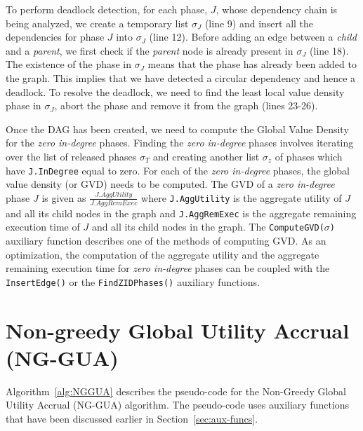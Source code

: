 \documentclass[12pt,dvips]{report}
\begin{document}
To perform deadlock detection, for each phase, $J$, whose dependency chain is being analyzed, we create a temporary list $\sigma_J$ (line 9) and insert all the dependencies for phase $J$ into $\sigma_J$ (line 12). Before adding an edge between a \textit{child} and a \textit{parent}, we first check if the \textit{parent} node is already present in $\sigma_J$ (line 18). The existence of the phase in $\sigma_J$ means that the phase has already been added to the graph. This implies that we have detected a circular dependency and hence a deadlock. To resolve the deadlock, we need to find the least local value density phase in $\sigma_J$, abort the phase and remove it from the graph (lines 23-26).

Once the DAG has been created, we need to compute the Global Value Density for the \textit{zero in-degree} phases. Finding the \textit{zero in-degree} phases involves iterating over the list of released phases $\sigma_T$ and creating another list $\sigma_z$ of phases which have \texttt{J.InDegree} equal to zero. For each of the \textit{zero in-degree} phases, the global value density (or GVD) needs to be computed. The GVD of a \textit{zero in-degree} phase $J$ is given as $\frac{J.AggUtility}{J.AggRemExec}$ where \texttt{J.AggUtility} is the aggregate utility of $J$ and all its child nodes in the graph and \texttt{J.AggRemExec} is the aggregate remaining execution time of $J$ and all its child nodes in the graph. The \texttt{ComputeGVD($\sigma$)} auxiliary function describes one of the methods of computing GVD. As an optimization, the computation of the aggregate utility and the aggregate remaining execution time for \textit{zero in-degree} phases can be coupled with the \texttt{InsertEdge()} or the \texttt{FindZIDPhases()} auxiliary functions.


\section{Non-greedy Global Utility Accrual (NG-GUA)}\label{sec:nggua}

Algorithm~\ref{alg:NGGUA} describes the pseudo-code for the Non-Greedy Global Utility Accrual (NG-GUA) algorithm. The pseudo-code uses auxiliary functions that have been discussed earlier in Section~\ref{sec:aux-funcs}.
\end{document}
